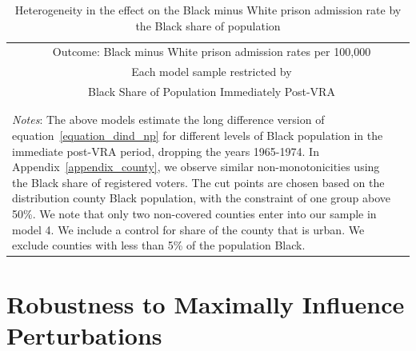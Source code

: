 \documentclass[12pt]{article}
\begin{document}
\begin{table}[h!]\centering \footnotesize
	\def\sym#1{\ifmmode^{#1}\else\(^{#1}\)\fi}
		\caption{Heterogeneity in the effect on the Black minus White prison admission rate by the Black share of population}\label{table_heterogeneous2}
		\smallskip
		\begin{tabular}{@{\extracolsep{5pt}}l*{5}{c}}
			\noalign{\smallskip}\hline\hline\noalign{\smallskip}\noalign{\smallskip}
						&  \multicolumn{4}{c}{Outcome: Black minus White prison admission rates per 100,000} \\
					\cline{2-5}   \noalign{\smallskip}
						&  \multicolumn{4}{c}{Each model sample restricted by} \\
						&  \multicolumn{4}{c}{Black Share of Population Immediately Post-VRA} \\
					 \\
		\noalign{\vspace*{-.17in}}\hline\hline\noalign{\smallskip}
		\multicolumn{5}{l}{\scriptsize \sym{*} \(p<0.1\), \sym{**} \(p<0.05\), \sym{***} \(p<0.01\)}\\
		\multicolumn{5}{p{5.1in}}{\scriptsize  \emph{Notes}: The above models estimate the long difference version of equation~\ref{equation_dind_np} for different levels of Black population in the immediate post-VRA period, dropping the years 1965-1974.  In Appendix~\ref{appendix_county}, we observe similar non-monotonicities using the Black share of registered voters. The cut points are chosen based on the distribution county Black population, with the constraint of one group above 50\%.  We note that only two non-covered counties enter into our sample in model 4.  We include a control for share of the county that is urban.  We exclude counties with less than 5\% of the population Black.}
	\end{tabular}
	\end{table}


\clearpage \newpage
\section{Robustness to Maximally Influence Perturbations}\label{appendix_broderick}
\setcounter{table}{0}
\setcounter{figure}{0}
\renewcommand{\thetable}{N\arabic{table}}
\renewcommand{\thefigure}{N\arabic{figure}}
\normalsize
\end{document}

